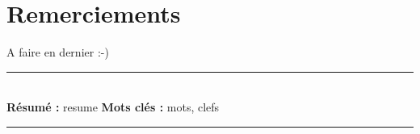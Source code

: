 \documentclass[a4paper,11pt,twoside]{StyleThese}
\begin{document}


    \makeflyleaf


\dominitoc


 \cleardoublepage

\section*{Remerciements}

A faire en dernier :-) 

\tableofcontents

\mainmatter







\appendix




%



\cleardoublepage
\begin{vcenterpage}
\noindent\rule[2pt]{\textwidth}{0.5pt}
\\
{\large\textbf{Résumé :}}
resume
{\large\textbf{Mots clés :}}
mots, clefs
\\
\noindent\rule[2pt]{\textwidth}{0.5pt}
\end{vcenterpage}
\end{document}
